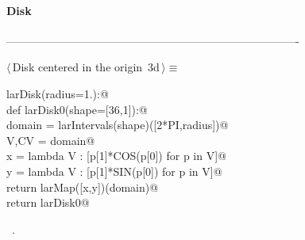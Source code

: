 \documentclass[11pt,oneside]{article}	%
\begin{document}
\paragraph{Disk}
-------------------------------------------------------------------------------
\begin{flushleft} \small \label{scrap7}
\protect{}$\langle\,$Disk centered in the origin\nobreak\ {\footnotesize 3d}$\,\rangle\equiv$
\vspace{-1ex}
\begin{list}{}{} \item
\mbox{}\verb@def larDisk(radius=1.):@\\
\mbox{}\verb@   def larDisk0(shape=[36,1]):@\\
\mbox{}\verb@      domain = larIntervals(shape)([2*PI,radius])@\\
\mbox{}\verb@      V,CV = domain@\\
\mbox{}\verb@      x = lambda V : [p[1]*COS(p[0]) for p in V]@\\
\mbox{}\verb@      y = lambda V : [p[1]*SIN(p[0]) for p in V]@\\
\mbox{}\verb@      return larMap([x,y])(domain)@\\
\mbox{}\verb@   return larDisk0@\\
\mbox{}\verb@@{\NWsep}
\end{list}
\vspace{-1ex}
\footnotesize\addtolength{\baselineskip}{-1ex}
\begin{list}{}{\setlength{\itemsep}{-\parsep}\setlength{\itemindent}{-\leftmargin}}
\item \NWtxtMacroRefIn\ .
\end{list}
\end{flushleft}
\end{document}
